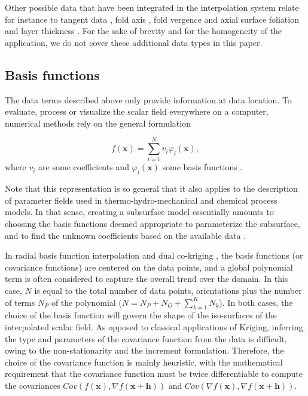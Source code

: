 \documentclass[preprint]{ring20}
\newcommand{\bx}{\mathbf{x}}
\begin{document}
Other possible data that have been integrated in the interpolation system relate for instance to tangent data \citep{Lajaunie1997MG, Caumon2013GaRSITo, Hillier2014MG}, fold axis \citep{MassiotGM2010,Hillier2014MG}, fold vergence and axial surface foliation \citep{Laurent2016EaPSL,Grose2017JSG} and layer thickness \citep{Laurent2016MG}. For the sake of brevity and for the homogeneity of the application, we do not cover these additional data types in this paper. 

\subsection{Basis functions} 

The data terms described above only provide information at data location. To evaluate, process or visualize the scalar field everywhere on a computer, numerical methods rely on the general formulation 

\begin{equation}
\label{eq:basis}
  f(\mathbf{x}) = \sum_{i=1}^{N}{v_i\varphi_i(\mathbf{x})},
\end{equation}
\noindent where $v_i$ are some coefficients and $\varphi_i(\mathbf{x})$ some basis functions \citep[e.g., ][]{Hillier2014MG,Renaudeau2019MG}.

Note that this representation is so general that it also applies to the description of parameter fields used in thermo-hydro-mechanical and chemical process models. 
In that sense, creating a subsurface model essentially amounts to choosing the basis functions deemed appropriate to parameterize the subsurface, and to find the unknown coefficients based on the available data \citep{Caumon2018HoMG,Wellmann2018AiG}.
 
In radial basis function interpolation \citep[RBF, ][]{Carr2001,Cowan2002ASGMEM,Hillier2014MG} and dual co-kriging \citep{Lajaunie1997MG,Chiles04OMSMP,Calcagno2008PEPI,delaVarga2018GMDD,Pizzella2022MG}, the basis functions (or covariance functions) are centered on the data points, and a global polynomial term is often considered to capture the overall trend over the domain. In this case, $N$ is equal to the total number of data points, orientations plus the number of terms $N_P$ of the polynomial ($N = N_P + N_O + \sum_{k=1}^{K}{N_k}$). In both cases, the choice of the basis function will govern the shape of the iso-surfaces of the interpolated scalar field. As opposed to classical applications of Kriging, inferring the type and parameters of the covariance function from the data is difficult, owing to the non-stationarity and the increment formulation. Therefore, the choice of the covariance function is mainly heuristic, with the mathematical requirement that the covariance function must be twice differentiable to compute the covariances $Cov\left(f(\bx), \nabla {f}(\bx+\mathbf{h})\right)$ and $Cov\left(\nabla f(\bx), \nabla f(\bx+\mathbf{h})\right)$. 
\end{document}
